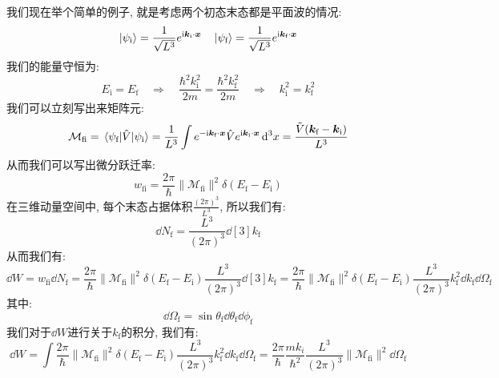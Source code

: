我们现在举个简单的例子, 就是考虑两个初态末态都是平面波的情况:
\begin{equation}
  \ket{\psi_{\text{i}}} = \frac{1}{\sqrt{L^3}} e^{\mathrm{i} \bm{k}_{\text{i}} \cdot \bm{x}} \quad \ket{\psi_{\text{f}}} = \frac{1}{\sqrt{L^3}} e^{\mathrm{i} \bm{k}_{\text{f}} \cdot \bm{x}}
\end{equation}
我们的能量守恒为:
\begin{equation}
  E_{\text{i}} = E_{\text{f}} \quad \Rightarrow \quad \frac{\hbar^2 k_{\text{i}}^2}{2m} = \frac{\hbar^2 k_{\text{f}}^2}{2m} \quad \Rightarrow \quad k_{\text{i}}^2 = k_{\text{f}}^2
\end{equation}
我们可以立刻写出来矩阵元:
\begin{equation}
  \mathcal{M}_{\text{fi}} = \mel{\psi_{\text{f}}}{\hat{V}}{\psi_{\text{i}}} = \frac{1}{L^3} \int e^{-\mathrm{i} \bm{k}_{\text{f}} \cdot \bm{x}} \hat{V} e^{\mathrm{i} \bm{k}_{\text{i}} \cdot \bm{x}} \dd[3]{x} = \frac{\tilde{V}(\bm{k}_{\text{f}} - \bm{k}_{\text{i}})}{L^3}
\end{equation}
从而我们可以写出微分跃迁率:
\begin{equation}
  w_{\text{fi}} = \frac{2\pi}{\hbar} \|\mathcal{M}_{\text{fi}}\|^2 \delta(E_{\text{f}} - E_{\text{i}})
\end{equation}
在三维动量空间中, 每个末态占据体积$\frac{(2\pi)^3}{L^3}$, 所以我们有:
\begin{equation}
  \dd{N_{\text{f}}} = \frac{L^3}{(2\pi)^3} \dd[3]{k_{\text{f}}}
\end{equation}
从而我们有:
\begin{equation}
  \dd{W} = w_{\text{fi}} \dd{N_{\text{f}}} = \frac{2\pi}{\hbar} \|\mathcal{M}_{\text{fi}}\|^2 \delta(E_{\text{f}} - E_{\text{i}}) \frac{L^3}{(2\pi)^3} \dd[3]{k_{\text{f}}} = \frac{2\pi}{\hbar} \|\mathcal{M}_{\text{fi}}\|^2 \delta(E_{\text{f}} - E_{\text{i}}) \frac{L^3}{(2\pi)^3} k_{\text{f}}^2 \dd{k_{\text{f}}} \dd{\Omega_{\text{f}}}
\end{equation}
其中:
\begin{equation}
  \dd{\Omega_{\text{f}}} = \sin\theta_{\text{f}} \dd{\theta_{\text{f}}} \dd{\phi_{\text{f}}}
\end{equation}
我们对于$\dd{W}$进行关于$k_{\text{f}}$的积分, 我们有:
\begin{equation}
  \dd{W} = \int \frac{2\pi}{\hbar} \|\mathcal{M}_{\text{fi}}\|^2 \delta(E_{\text{f}} - E_{\text{i}}) \frac{L^3}{(2\pi)^3} k_{\text{f}}^2 \dd{k_{\text{f}}} \dd{\Omega_{\text{f}}} = \frac{2\pi}{\hbar} \frac{m k_i}{\hbar^2} \frac{L^3}{(2\pi)^3} \|\mathcal{M}_{\text{fi}}\|^2 \dd{\Omega_{\text{f}}}
\end{equation}
